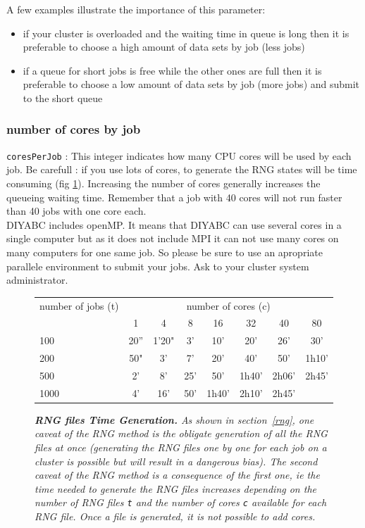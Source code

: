 A few examples illustrate the importance of this parameter:
\begin{itemize}
 \item  if your cluster is overloaded and the waiting time in queue is long then it is preferable to choose a high amount of data sets by job (less jobs)
 \item if a queue for short jobs is free while the other ones are full then it is preferable to choose a low amount of data sets by job (more jobs) and submit to the short queue
\end{itemize}

\subsubsection{number of cores by job}
\texttt{coresPerJob} : This integer indicates how many CPU cores will be used by each job. Be carefull : if you use lots of cores, to generate the RNG states will be time consuming (fig \ref{fig:rngTimeGeneration}). Increasing the number of cores generally increases the queueing waiting time. Remember that a job with 40 cores will not run faster than 40 jobs with one core each. \\
DIYABC includes openMP. It means that DIYABC can use several cores in a single computer but as it does not include MPI it can not use many cores on many computers for one same job. So please be sure to use an apropriate parallele environment to submit your jobs. Ask to your cluster system administrator. 

\begin{figure}[htb]
\centering \it	
  \begin{tabular}{|  l || c | c | c | c | c | c | c | }
	   \hline
	   number of jobs (t) & \multicolumn{7}{c|}{number of cores (c)} \\
	          & 1 & 4   & 8     & 16 & 32 & 40 & 80 \\
	   \hline \hline
	   100 & 20''  & 1'20" & 3'  & 10'   & 20'   & 26'   & 30' \\
	   \hline
	   200 & 50" & 3'    & 7'  & 20'   & 40'   & 50'   & 1h10' \\
	   \hline
	   500 & 2'  & 8'    & 25' & 50'   & 1h40' & 2h06' & 2h45' \\
	   \hline
	   1000 & 4' & 16'   & 50' & 1h40' & 2h10' & 2h45' & \\
	   \hline
   \end{tabular}
  \caption[width=.6\textwidth]{\label{fig:rngTimeGeneration} \it\footnotesize
    \textbf{RNG files Time Generation.} As shown in section~\ref{rng}, one caveat of the RNG
    method is the obligate generation of all the RNG files at once (generating the RNG files one by one 
    for each job on a cluster is possible but will result in a dangerous bias). The second
    caveat of the RNG method is a consequence of the first one, ie the time needed to generate the RNG
    files increases depending on the number of RNG files \texttt{t} and the number of cores \texttt{c}
    available for each RNG file. Once a file is generated, it is not possible to add cores. }
\end{figure}

